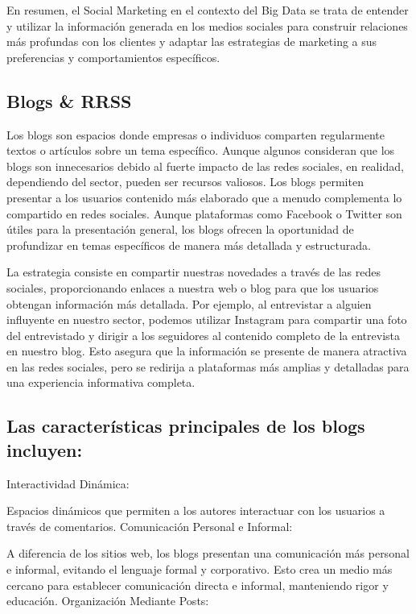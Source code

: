 \documentclass[
    a4paper, %
    10pt, %
    unnumberedsections, %
    twoside, %
]{LTJournalArticle}
\begin{document}
En resumen, el Social Marketing en el contexto del Big Data se trata de entender y utilizar la información generada en los medios sociales para construir relaciones más profundas con los clientes y adaptar las estrategias de marketing a sus preferencias y comportamientos específicos.


\subsection{Blogs \& RRSS}

Los blogs son espacios donde empresas o individuos comparten regularmente textos o artículos sobre un tema específico. Aunque algunos consideran que los blogs son innecesarios debido al fuerte impacto de las redes sociales, en realidad, dependiendo del sector, pueden ser recursos valiosos. Los blogs permiten presentar a los usuarios contenido más elaborado que a menudo complementa lo compartido en redes sociales. Aunque plataformas como Facebook o Twitter son útiles para la presentación general, los blogs ofrecen la oportunidad de profundizar en temas específicos de manera más detallada y estructurada.

La estrategia consiste en compartir nuestras novedades a través de las redes sociales, proporcionando enlaces a nuestra web o blog para que los usuarios obtengan información más detallada. Por ejemplo, al entrevistar a alguien influyente en nuestro sector, podemos utilizar Instagram para compartir una foto del entrevistado y dirigir a los seguidores al contenido completo de la entrevista en nuestro blog. Esto asegura que la información se presente de manera atractiva en las redes sociales, pero se redirija a plataformas más amplias y detalladas para una experiencia informativa completa.

\subsection{Las características principales de los blogs incluyen:}


Interactividad Dinámica:

Espacios dinámicos que permiten a los autores interactuar con los usuarios a través de comentarios.
Comunicación Personal e Informal:

A diferencia de los sitios web, los blogs presentan una comunicación más personal e informal, evitando el lenguaje formal y corporativo. Esto crea un medio más cercano para establecer comunicación directa e informal, manteniendo rigor y educación.
Organización Mediante Posts:
\end{document}
